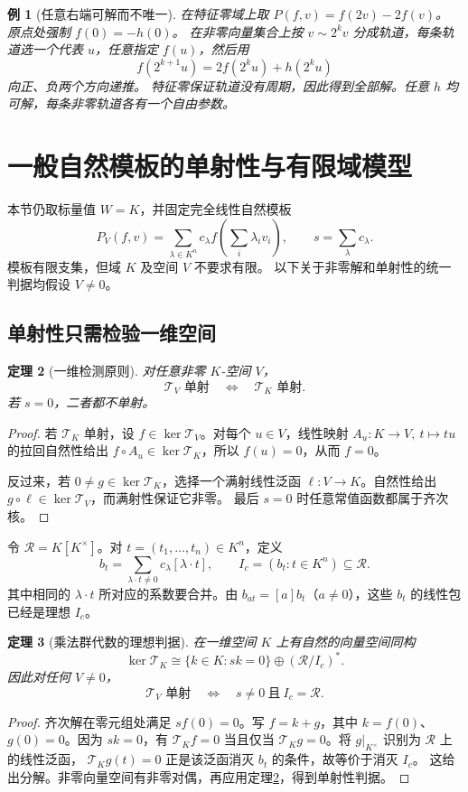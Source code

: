 \documentclass[11pt,a4paper,oneside,openany]{book}
\theoremstyle{lecture}
\newtheorem{theorem}{定理}[section]
\newtheorem{example}[theorem]{例}
\newcommand{\T}{\mathcal T}
\numberwithin{equation}{section}
\begin{document}
\begin{example}[任意右端可解而不唯一]
在特征零域上取 $P(f,v)=f(2v)-2f(v)$。
原点处强制 $f(0)=-h(0)$。
在非零向量集合上按 $v\sim2^k v$ 分成轨道，每条轨道选一个代表 $u$，任意指定 $f(u)$，然后用
\[
 f(2^{k+1}u)=2f(2^ku)+h(2^ku)
\]
向正、负两个方向递推。
特征零保证轨道没有周期，因此得到全部解。任意 $h$ 均可解，每条非零轨道各有一个自由参数。
\end{example}



\section{一般自然模板的单射性与有限域模型}\label{lin:sec:generalideal}
本节仍取标量值 $W=K$，并固定完全线性自然模板
\[
 P_V(f,v)=\sum_{\lambda\in K^n}c_\lambda
 f\!\left(\sum_i\lambda_i v_i\right),\qquad
 s=\sum_\lambda c_\lambda.
\]
模板有限支集，但域 $K$ 及空间 $V$ 不要求有限。
以下关于非零解和单射性的统一判据均假设 $V\ne0$。

\subsection{单射性只需检验一维空间}
\begin{theorem}[一维检测原则]\label{lin:thm:onedetect}
对任意非零 $K$-空间 $V$，
\[
 \T_V\text{ 单射}\quad\Longleftrightarrow\quad\T_K\text{ 单射}.
\]
若 $s=0$，二者都不单射。
\end{theorem}
\begin{proof}
若 $\T_K$ 单射，设 $f\in\ker\T_V$。对每个 $u\in V$，线性映射
$A_u:K\to V,\ t\mapsto tu$ 的拉回自然性给出
$f\circ A_u\in\ker\T_K$，所以 $f(u)=0$，从而 $f=0$。

反过来，若 $0\ne g\in\ker\T_K$，选择一个满射线性泛函
$\ell:V\to K$。自然性给出 $g\circ\ell\in\ker\T_V$，而满射性保证它非零。
最后 $s=0$ 时任意常值函数都属于齐次核。
\end{proof}

令 $\mathscr R=K[K^\times]$。对 $t=(t_1,\ldots,t_n)\in K^n$，定义
\[
 b_t=\sum_{\lambda\cdot t\ne0}c_\lambda[\lambda\cdot t],
 \qquad
 I_c=(b_t:t\in K^n)\subseteq\mathscr R.
\]
其中相同的 $\lambda\cdot t$ 所对应的系数要合并。由
$b_{at}=[a]b_t$（$a\ne0$），这些 $b_t$ 的线性包已经是理想 $I_c$。

\begin{theorem}[乘法群代数的理想判据]\label{lin:thm:generalideal}
在一维空间 $K$ 上有自然的向量空间同构
\[
 \ker\T_K\cong \{k\in K:sk=0\}\oplus(\mathscr R/I_c)^*.
\]
因此对任何 $V\ne0$，
\begin{equation}\label{lin:eq:generalinject}
 \T_V\text{ 单射}
 \quad\Longleftrightarrow\quad s\ne0\ \text{且}\ I_c=\mathscr R.
\end{equation}
\end{theorem}
\begin{proof}
齐次解在零元组处满足 $sf(0)=0$。写 $f=k+g$，其中
$k=f(0)$、$g(0)=0$。因为 $sk=0$，有 $\T_Kf=0$ 当且仅当
$\T_Kg=0$。将 $g|_{K^\times}$ 识别为 $\mathscr R$ 上的线性泛函，
$\T_Kg(t)=0$ 正是该泛函消灭 $b_t$ 的条件，故等价于消灭 $I_c$。
这给出分解。非零向量空间有非零对偶，再应用定理\ref{lin:thm:onedetect}，得到单射性判据。
\end{proof}
\end{document}
